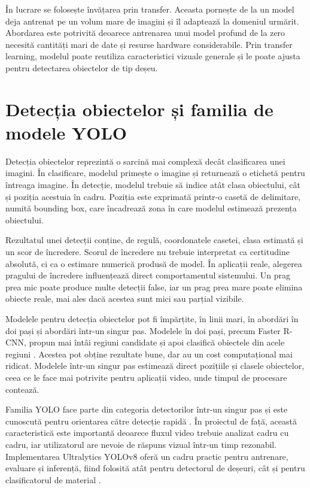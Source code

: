 În lucrare se folosește învățarea prin transfer. Aceasta pornește de la un model deja antrenat pe un volum mare de imagini și îl adaptează la domeniul urmărit. Abordarea este potrivită deoarece antrenarea unui model profund de la zero necesită cantități mari de date și resurse hardware considerabile. Prin transfer learning, modelul poate reutiliza caracteristici vizuale generale și le poate ajusta pentru detectarea obiectelor de tip deșeu.

\section{Detecția obiectelor și familia de modele YOLO}

Detecția obiectelor reprezintă o sarcină mai complexă decât clasificarea unei imagini. În clasificare, modelul primește o imagine și returnează o etichetă pentru întreaga imagine. În detecție, modelul trebuie să indice atât clasa obiectului, cât și poziția acestuia în cadru. Poziția este exprimată printr-o casetă de delimitare, numită bounding box, care încadrează zona în care modelul estimează prezența obiectului.

Rezultatul unei detecții conține, de regulă, coordonatele casetei, clasa estimată și un scor de încredere. Scorul de încredere nu trebuie interpretat ca certitudine absolută, ci ca o estimare numerică produsă de model. În aplicații reale, alegerea pragului de încredere influențează direct comportamentul sistemului. Un prag prea mic poate produce multe detecții false, iar un prag prea mare poate elimina obiecte reale, mai ales dacă acestea sunt mici sau parțial vizibile.

Modelele pentru detecția obiectelor pot fi împărțite, în linii mari, în abordări în doi pași și abordări într-un singur pas. Modelele în doi pași, precum Faster R-CNN, propun mai întâi regiuni candidate și apoi clasifică obiectele din acele regiuni \cite{ren2015faster}. Acestea pot obține rezultate bune, dar au un cost computațional mai ridicat. Modelele într-un singur pas estimează direct pozițiile și clasele obiectelor, ceea ce le face mai potrivite pentru aplicații video, unde timpul de procesare contează.

Familia YOLO face parte din categoria detectorilor într-un singur pas și este cunoscută pentru orientarea către detecție rapidă \cite{redmon2016yolo}. În proiectul de față, această caracteristică este importantă deoarece fluxul video trebuie analizat cadru cu cadru, iar utilizatorul are nevoie de răspuns vizual într-un timp rezonabil. Implementarea Ultralytics YOLOv8 oferă un cadru practic pentru antrenare, evaluare și inferență, fiind folosită atât pentru detectorul de deșeuri, cât și pentru clasificatorul de material \cite{ultralytics2023yolov8}.

